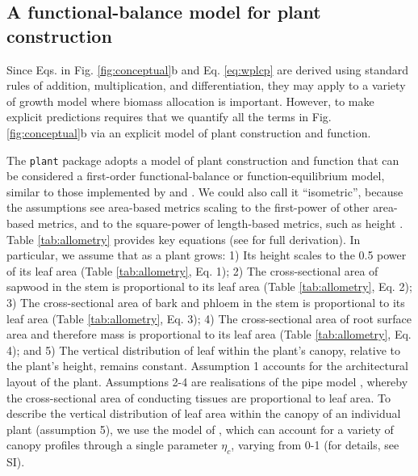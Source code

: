 \documentclass[9pt,twocolumn,twoside,lineno]{pnas-new}
\newcommand{\plant}{\texttt{plant}}
\begin{document}
\subsection*{A functional-balance model for plant construction}

Since Eqs. in Fig. \ref{fig:conceptual}b and Eq. \ref{eq:wplcp} are derived using standard rules of addition, multiplication, and differentiation, they may apply to a variety of growth model where biomass allocation is important. However, to make explicit predictions requires that we quantify all the terms in Fig. \ref{fig:conceptual}b via an explicit model of plant construction and function.

The {\plant} package adopts a model of plant construction and function that can be considered a first-order functional-balance or function-equilibrium model, similar to those implemented by \citep{Makela-1997} and \citep{Moorcroft-2001}. We could also call it ``isometric'', because the assumptions see area-based metrics scaling to the first-power of other area-based metrics, and to the square-power of length-based metrics, such as height \citep{Huxley-1932}. Table \ref{tab:allometry} provides key equations (see \citep{Falster-2016} for full derivation). In particular, we assume that as a plant grows:
1) Its height scales to the 0.5 power of its leaf area (Table \ref{tab:allometry}, Eq. {\color{pnasbluetext}1});
2) The cross-sectional area of sapwood in the stem is proportional to its leaf area (Table \ref{tab:allometry}, Eq. {\color{pnasbluetext}2});
3) The cross-sectional area of bark and phloem in the stem  is proportional to its leaf area (Table \ref{tab:allometry}, Eq. {\color{pnasbluetext}3});
4) The cross-sectional area of root surface area and therefore mass is proportional to its leaf area (Table \ref{tab:allometry}, Eq. {\color{pnasbluetext}4}); and
5) The vertical distribution of leaf within the plant's canopy, relative to the plant's height, remains constant.
Assumption 1 accounts for the architectural layout of the plant. Assumptions 2-4 are realisations of the pipe model \citep{Shinozaki-1964}, whereby the cross-sectional area of conducting tissues are proportional to leaf area. To describe the vertical distribution of leaf area within the canopy of an individual plant (assumption 5), we use the model of \citep{Yokozawa-1995}, which can account for a variety of canopy profiles through a single parameter $\eta_c$, varying from 0-1 (for details, see SI).
\end{document}
